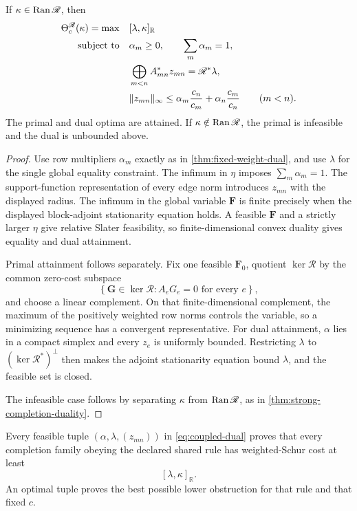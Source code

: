 \begin{theorem}
\label{thm:coupled-rule-dual}
If \(\kappa\in\operatorname{Ran}\mathscr R\), then
\begin{align}
 \Theta_c^{\mathscr R}(\kappa)
 =
 \max\quad&
 [\lambda,\kappa]_{\mathbb R}
 \label{eq:coupled-dual}\\
 \textup{subject to}\quad&
 \alpha_m\ge0,\qquad\sum_m\alpha_m=1,\notag\\
 &
 \bigoplus_{m<n}A_{mn}^*z_{mn}
 =
 \mathscr R^*\lambda,\notag\\
 &
 \|z_{mn}\|_\infty
 \le
 \alpha_m\frac{c_n}{c_m}
 +
 \alpha_n\frac{c_m}{c_n}
 \qquad(m<n).\notag
\end{align}
The primal and dual optima are attained.  If
\(\kappa\notin\operatorname{Ran}\mathscr R\), the primal is infeasible and the dual is
unbounded above.
\end{theorem}

\begin{proof}
Use row multipliers \(\alpha_m\) exactly as in
\cref{thm:fixed-weight-dual}, and use \(\lambda\) for the single global
equality constraint.  The infimum in \(\eta\) imposes
\(\sum_m\alpha_m=1\).  The support-function representation of every
edge norm introduces \(z_{mn}\) with the displayed radius.  The
infimum in the global variable \(\boldsymbol F\) is finite precisely when
the displayed block-adjoint stationarity equation holds.  A feasible
\(\boldsymbol F\) and a strictly larger \(\eta\) give relative Slater
feasibility, so finite-dimensional convex duality gives equality and
dual attainment.

Primal attainment follows separately.  Fix one feasible
\(\boldsymbol F_0\), quotient \(\ker\mathscr R\) by the common zero-cost
subspace
\[
 \left\{
 \boldsymbol G\in\ker\mathscr R:
 A_eG_e=0\text{ for every }e
 \right\},
\]
and choose a linear complement.  On that finite-dimensional complement,
the maximum of the positively weighted row norms controls the variable,
so a minimizing sequence has a convergent representative.  For dual
attainment, \(\alpha\) lies in a compact simplex and every \(z_e\) is
uniformly bounded.  Restricting \(\lambda\) to
\((\ker\mathscr R^*)^\perp\) then makes the adjoint stationarity equation
bound \(\lambda\), and the feasible set is closed.

The infeasible case follows by separating
\(\kappa\) from \(\operatorname{Ran}\mathscr R\), as in
\cref{thm:strong-completion-duality}.
\end{proof}

\begin{corollary}
\label{cor:shared-rule-obstruction}
Every feasible tuple
\((\alpha,\lambda,(z_{mn}))\) in
\eqref{eq:coupled-dual} proves that every completion family obeying the
declared shared rule has weighted-Schur cost at least
\[
 [\lambda,\kappa]_{\mathbb R}.
\]
An optimal tuple proves the best possible lower obstruction for that
rule and that fixed \(c\).
\end{corollary}

